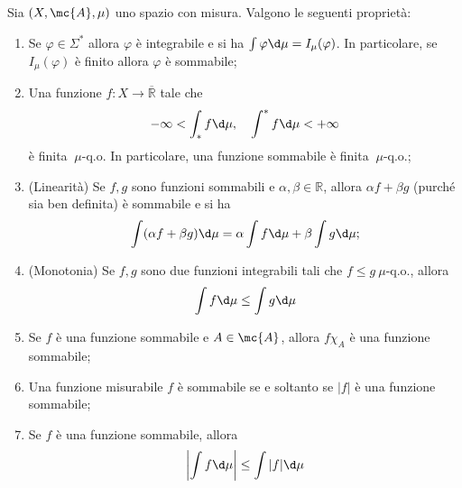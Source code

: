 \begin{shadedTheorem}\label{thm: 7pt}
    Sia $(X, \mc{A}, \mu)$ uno spazio con misura. Valgono le seguenti proprietà:
    \begin{enumerate}
        \item \label{7pt: 1}Se $\varphi \in \Sigma^{*}$ allora $\varphi$ è integrabile e si ha $\int \varphi \d \mu=I_{\mu}(\varphi)$. In particolare, se $I_{\mu}(\varphi)$ è finito allora $\varphi$ è sommabile;
        \item \label{7pt: 2}Una funzione $f: X \rightarrow \overline{\mathbb{R}}$ tale che
        \[
        -\infty<\int_{*} f \d \mu, \quad \int^{*} f \d \mu<+\infty
        \]
        è finita $\ \mu$-q.o. In particolare, una funzione sommabile è finita $\ \mu$-q.o.;
        \item \label{7pt: 3}(Linearità) Se $f, g$ sono funzioni sommabili e $\alpha, \beta \in \mathbb{R}$, allora $\alpha f+\beta g$ (purché sia ben definita) è sommabile e si ha
        \[
        \int(\alpha f+\beta g) \d \mu=\alpha \int f \d \mu+\beta \int g \d \mu ;
        \]
        \item \label{7pt: 4}(Monotonia) Se $f, g$ sono due funzioni integrabili tali che $f \leq g \ \mu$-q.o., allora
        \[
        \int f \d \mu \leq \int g \d \mu
        \]
        \item \label{7pt: 5}Se $f$ è una funzione sommabile e $A \in \mc{A}$, allora $f \chi_{A}$ è una funzione sommabile;
        \item \label{7pt: 6}Una funzione misurabile $f$ è sommabile se e soltanto se $|f|$ è una funzione sommabile;
        \item \label{7pt: 7}Se $f$ è una funzione sommabile, allora
        \[
        \left|\int f \d \mu\right| \leq \int|f| \d \mu
        \]
    \end{enumerate}
\end{shadedTheorem}
